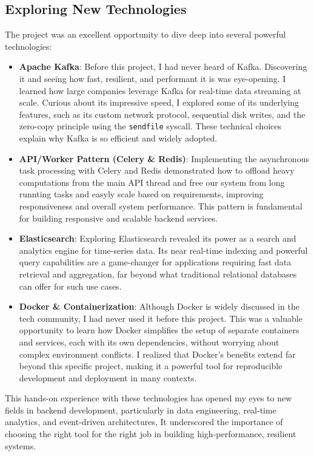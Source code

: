 \subsection{Exploring New Technologies}
The project was an excellent opportunity to dive deep into several powerful technologies:
\begin{itemize}
    \item \textbf{Apache Kafka}: Before this project, I had never heard of Kafka. Discovering it and seeing how fast, resilient, and performant it is was eye-opening. I learned how large companies leverage Kafka for real-time data streaming at scale. Curious about its impressive speed, I explored some of its underlying features, such as its custom network protocol, sequential disk writes, and the zero-copy principle using the \texttt{sendfile} syscall. These technical choices explain why Kafka is so efficient and widely adopted.
    \item \textbf{API/Worker Pattern (Celery \& Redis)}: Implementing the asynchronous task processing with Celery and Redis demonstrated how to offload heavy computations from the main API thread and free our system from long runnting tasks and easyly scale based on requirements, improving responsiveness and overall system performance. This pattern is fundamental for building responsive and scalable backend services.
    \item \textbf{Elasticsearch}: Exploring Elasticsearch revealed its power as a search and analytics engine for time-series data. Its near real-time indexing and powerful query capabilities are a game-changer for applications requiring fast data retrieval and aggregation, far beyond what traditional relational databases can offer for such use cases.
    \item \textbf{Docker \& Containerization}: Although Docker is widely discussed in the tech community, I had never used it before this project. This was a valuable opportunity to learn how Docker simplifies the setup of separate containers and services, each with its own dependencies, without worrying about complex environment conflicts. I realized that Docker's benefits extend far beyond this specific project, making it a powerful tool for reproducible development and deployment in many contexts.
\end{itemize}
This hands-on experience with these technologies has opened my eyes to new fields in backend development, particularly in data engineering, real-time analytics, and event-driven architectures,  It underscored the importance of choosing the right tool for the right job in building high-performance, resilient systems.
